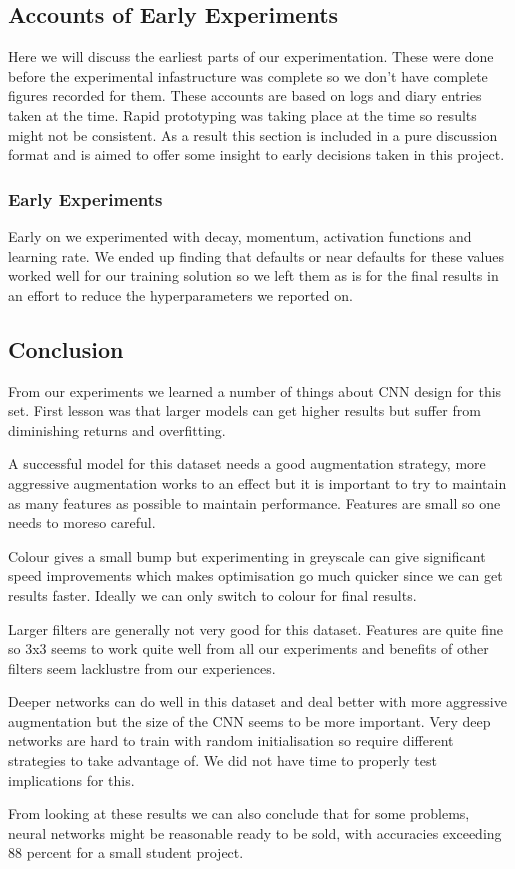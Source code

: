\subsection{Accounts of Early Experiments}
Here we will discuss the earliest parts of our experimentation. These were done before the experimental infastructure was complete so we don't have complete figures recorded for them. These accounts are based on logs and diary entries taken at the time. Rapid prototyping was taking place at the time so results might not be consistent. As a result this section is included in a pure discussion format and is aimed to offer some insight to early decisions taken in this project.

\subsubsection{Early Experiments}
Early on we experimented with decay, momentum, activation functions and learning rate. We ended up finding that defaults or near defaults for these values worked well for our training solution so we left them as is for the final results in an effort to reduce the hyperparameters we reported on.


\subsection{Conclusion}
From our experiments we learned a number of things about CNN design for this set. First lesson was that larger models can get higher results but suffer from diminishing returns and overfitting.

A successful model for this dataset needs a good augmentation strategy, more aggressive augmentation works to an effect but it is important to try to maintain as many features as possible to maintain performance. Features are small so one needs to moreso careful.

Colour gives a small bump but experimenting in greyscale can give significant speed improvements which makes optimisation go much quicker since we can get results faster. Ideally we can only switch to colour for final results.

Larger filters are generally not very good for this dataset. Features are quite fine so 3x3 seems to work quite well from all our experiments and benefits of other filters seem lacklustre from our experiences.

Deeper networks can do well in this dataset and deal better with more aggressive augmentation but the size of the CNN seems to be more important. Very deep networks are hard to train with random initialisation so require different strategies to take advantage of. We did not have time to properly test implications for this.

From looking at these results we can also conclude that for some problems, neural networks might be reasonable ready to be sold, with accuracies exceeding 88 percent for a small student project.